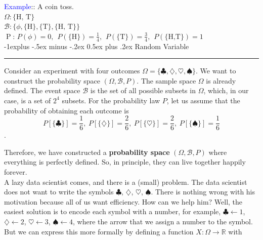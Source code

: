 \documentclass[letterpaper, 10.5pt,landscape]{article}
\makeatletter
\renewcommand{\subsection}{\@startsection{subsection}{2}{0mm}%
                                {-1explus -.5ex minus -.2ex}%
                                {0.5ex plus .2ex}%
                                {\normalfont\normalsize\bfseries}}
\makeatother
\begin{document}
\begin{multicols*}{3}
\textcolor{blue}{Example}:: A coin toss.\\
\(\Omega: \{\text{H, T}\} \) \\
\(\mathcal{B}: \big\{\phi, \{\text{H}\}, \{\text{T}\}, \{\text{H, T}\}  \big\} \) \\
$\mathrel{P}$: \( P(\phi) = 0, \hspace{5pt} P(\{ \text{H}\}) = \frac{1}{4}, \hspace{5pt} P(\{ \text{T}\}) = \frac{3}{4}, \hspace{5pt} P(\{\text{H,T}\}) = 1 \)
\\

























\subsection{Random Variable} {\color{teal}\hrule height 0.5pt} \smallskip

Consider an experiment with four outcomes \(\Omega = \{ \clubsuit, \diamondsuit, \heartsuit, \spadesuit \}\). We want to construct the probability space \( \left( \Omega, \mathcal{B}, P \right)\). The sample space $\Omega$ is already defined. The event space $\mathcal{B}$ is the set of all possible subsets in $\Omega$, which, in our case, is a set of $2^{4}$ subsets. For the probability law $P$, let us assume that the probability of obtaining each outcome is \vspace{-5pt}
\[P[\{\clubsuit\}] = \frac{1}{6}, \hspace{3pt} P[\{\diamondsuit\}] = \frac{2}{6}, \hspace{3pt} P[\{\heartsuit\}] = \frac{2}{6}, \hspace{3pt} P[\{\spadesuit\}] = \frac{1}{6}\].

\vspace{-5pt}

Therefore, we have constructed a \textbf{probability space} \( \left( \Omega, \mathcal{B}, P \right)\) where everything is perfectly defined. So, in principle, they can live together happily forever. \\
A lazy data scientist comes, and there is a (small) problem. The data scientist does not want to write the symbols $\clubsuit$, $\diamondsuit$, $\heartsuit$, $\spadesuit$. There is nothing wrong with his motivation because all of us want efficiency. How can we help him? Well, the easiest solution is to encode each symbol with a number, for example, $\clubsuit \leftarrow 1$,  $\diamondsuit \leftarrow 2$,
$\heartsuit \leftarrow 3$,
$\spadesuit \leftarrow 4$, where the arrow that we assign a number to the symbol. But we can express this more formally by defining a function \( \boxed{X: \Omega \rightarrow \mathbb{R}}\) with 
\vspace{-5pt}


\end{multicols*}
\end{document}
